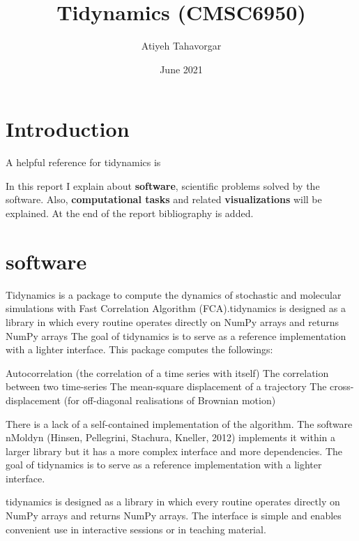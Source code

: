 \documentclass[12pt, a4paper, twoside]{report}
\title{Tidynamics (CMSC6950)}
\author{Atiyeh Tahavorgar }
\date{June 2021}
\begin{document}
\maketitle
\section{Introduction}
A helpful reference for tidynamics is \cite{deBuyl2018}

\newpage






In this report I explain about \textbf{software}, scientific problems solved by the software. Also, \textbf{computational tasks} and related \textbf{visualizations} will be explained. At the end of the report bibliography is added. 
\newpage
\section{software}
Tidynamics is a package to compute the dynamics of stochastic and molecular simulations with Fast Correlation Algorithm (FCA).tidynamics is designed as a library in which every routine operates directly on NumPy
arrays and returns NumPy arrays The goal of tidynamics is to serve as a reference implementation with a lighter interface. This package computes the followings:


Autocorrelation (the correlation of a time series with itself) 
The correlation between two time-series
\newline The mean-square displacement of a trajectory   
\newline  The cross-displacement (for off-diagonal realisations of Brownian motion)


There is a lack of a self-contained implementation of the algorithm. The software nMoldyn (Hinsen, Pellegrini, Stachura,  Kneller, 2012) implements it within a larger library but it has a more complex interface and more dependencies. The goal of tidynamics is to serve as a reference implementation with a lighter interface. 

tidynamics is designed as a library in which every routine operates directly on NumPy
arrays and returns NumPy arrays. The interface is simple and enables convenient use in
interactive sessions or in teaching material.
\end{document}
